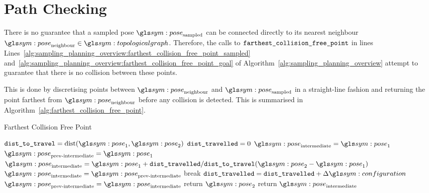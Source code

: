 \section{Path Checking}%
\label{sec:path_checking}

	\begin{sloppypar}

		There is no guarantee that a sampled pose $\pose_\text{sampled}$ can
		be connected directly to its nearest neighbour
		$\pose_\text{neighbour} \in \topologicalgraph$.  Therefore, the calls to
		$\texttt{farthest\_collision\_free\_point}$ in lines
		Lines~\ref{alg:sampling_planning_overview:farthest_collision_free_point_sampled}
		and~\ref{alg:sampling_planning_overview:farthest_collision_free_point_goal}
		of Algorithm~\ref{alg:sampling_planning_overview} attempt to
		guarantee that there is no collision between these points.

	\end{sloppypar}

	This is done by discretising points between $\pose_\text{neighbour}$ and
	$\pose_\text{sampled}$ in a straight-line fashion and returning the
	point farthest from $\pose_\text{neighbour}$ before any collision is
	detected. This is summarised in
	Algorithm~\ref{alg:farthest_collision_free_point}.

	\begin{algorithm}[ht]
		\caption{Farthest Collision Free Point}%
		\label{alg:farthest_collision_free_point}
		\begin{algorithmic}[1]
				\State{}$\code{dist\_to\_travel} = \dist(\pose_1, \pose_2)$
				\State{}$\texttt{dist\_travelled} = 0$
				\State{}$\pose_\text{intermediate} = \pose_1$
				\State{}$\pose_\text{prev-intermediate} = \pose_1$
					\State{}
						\(
							\pose_\text{intermediate} =
							\pose_1 +
							\code{dist\_travelled}/\code{dist\_to\_travel}
							(
								\pose_2 - \pose_1
							)
						\)
						\State{}$\pose_\text{intermediate} =
							\pose_\text{prev-intermediate}$
						\State{}break
					\EndIf{}
					\State{}$\code{dist\_travelled} =
						\code{dist\_travelled} + \Delta\configuration$
					\State{}$\pose_\text{prev-intermediate} =
						\pose_\text{intermediate}$
				\EndWhile{}
					\State{}return $\pose_2$
				\EndIf{}
				\State{}return $\pose_\text{intermediate}$
			\EndProcedure{}
		\end{algorithmic}
	\end{algorithm}

